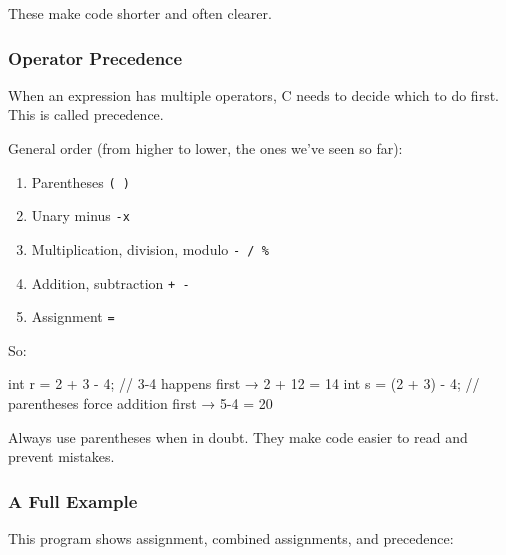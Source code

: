 \documentclass[
  letterpaper,
  DIV=11,
  numbers=noendperiod]{scrreprt}
\newenvironment{Shaded}{\begin{snugshade}}{\end{snugshade}}
\newcommand{\CommentTok}[1]{\textcolor[rgb]{0.37,0.37,0.37}{#1}}
\newcommand{\DataTypeTok}[1]{\textcolor[rgb]{0.68,0.00,0.00}{#1}}
\newcommand{\DecValTok}[1]{\textcolor[rgb]{0.68,0.00,0.00}{#1}}
\newcommand{\NormalTok}[1]{\textcolor[rgb]{0.00,0.23,0.31}{#1}}
\newcommand{\OperatorTok}[1]{\textcolor[rgb]{0.37,0.37,0.37}{#1}}
\providecommand{\tightlist}{%
  \setlength{\itemsep}{0pt}\setlength{\parskip}{0pt}}
\begin{document}
These make code shorter and often clearer.

\subsubsection{Operator Precedence}\label{operator-precedence}

When an expression has multiple operators, C needs to decide which to do
first. This is called precedence.

General order (from higher to lower, the ones we've seen so far):

\begin{enumerate}
\def\labelenumi{\arabic{enumi}.}
\tightlist
\item
  Parentheses \texttt{(\ )}
\item
  Unary minus \texttt{-x}
\item
  Multiplication, division, modulo \texttt{-\ /\ \%}
\item
  Addition, subtraction \texttt{+\ -}
\item
  Assignment \texttt{=}
\end{enumerate}

So:

\begin{Shaded}
\begin{Highlighting}[]
\DataTypeTok{int}\NormalTok{ r }\OperatorTok{=} \DecValTok{2} \OperatorTok{+} \DecValTok{3} \OperatorTok{{-}} \DecValTok{4}\OperatorTok{;}    \CommentTok{// 3{-}4 happens first → 2 + 12 = 14}
\DataTypeTok{int}\NormalTok{ s }\OperatorTok{=} \OperatorTok{(}\DecValTok{2} \OperatorTok{+} \DecValTok{3}\OperatorTok{)} \OperatorTok{{-}} \DecValTok{4}\OperatorTok{;}  \CommentTok{// parentheses force addition first → 5{-}4 = 20}
\end{Highlighting}
\end{Shaded}

Always use parentheses when in doubt. They make code easier to read and
prevent mistakes.

\subsubsection{A Full Example}\label{a-full-example-5}

This program shows assignment, combined assignments, and precedence:
\end{document}
